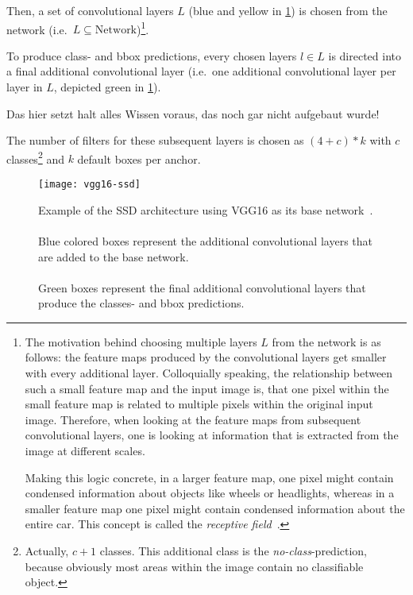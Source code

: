 Then, a set of \glspl{convolutional layer} \(L\) (blue and yellow in \cref{fig:ssd-vgg})
is chosen from the network (i.e.\ \(L\subseteq \text{Network}\))\footnote{\label{foot:receptive}The motivation
behind choosing multiple layers \(L\) from the network is as follows: the \glspl{feature map}
produced by the \glspl{convolutional layer} get smaller with every additional layer.
Colloquially speaking, the relationship between such a small \gls{feature map} and
the input image is, that one pixel within the small \gls{feature map} is related
to multiple pixels within the original input image. Therefore, when looking at the
\glspl{feature map} from subsequent \glspl{convolutional layer}, one is looking
at information that is extracted from the image at different scales.

Making this logic concrete, in a larger \gls{feature map}, one pixel might contain
condensed information about objects like wheels or headlights, whereas in a smaller
\gls{feature map} one pixel might contain  condensed information about the entire
car. This concept is called the \textit{receptive field}~\cite[cf.][331\psq]{Goodfellow.2016}.}.

To produce class- and \gls{bbox} predictions, every chosen \glspl{layer} \(l\in L\)
is directed into a final additional \gls{convolutional layer} (i.e.\ one additional
\gls{convolutional layer} per \gls{layer} in \(L\), depicted green in \cref{fig:ssd-vgg}).

Das hier setzt halt alles Wissen voraus, das noch gar nicht aufgebaut wurde!

The number of filters for these subsequent \glspl{layer} is chosen as \((4+c)*k\)
with \(c\) classes\footnote{Actually, \(c+1\) classes. This additional class is
the \textit{no-class}-prediction, because obviously most areas within the image
contain no classifiable object.} and \(k\) default boxes per \gls{anchor}.
\begin{figure}[ht]
    \centering
    \texttt{[image: vgg16-ssd]}
    \caption[Example of the SSD architecture using VGG16 as its base network]{Example
    of the SSD architecture using VGG16 as its base network~\cite[cf.][]{Liu.2016}.
    \\\\
    Blue colored boxes represent the additional \glspl{convolutional layer} that are added to the base network.
    \\\\
    Green boxes represent the final additional \glspl{convolutional layer} that produce
    the classes- and \gls{bbox} predictions.}
    \label{fig:ssd-vgg}
\end{figure}

